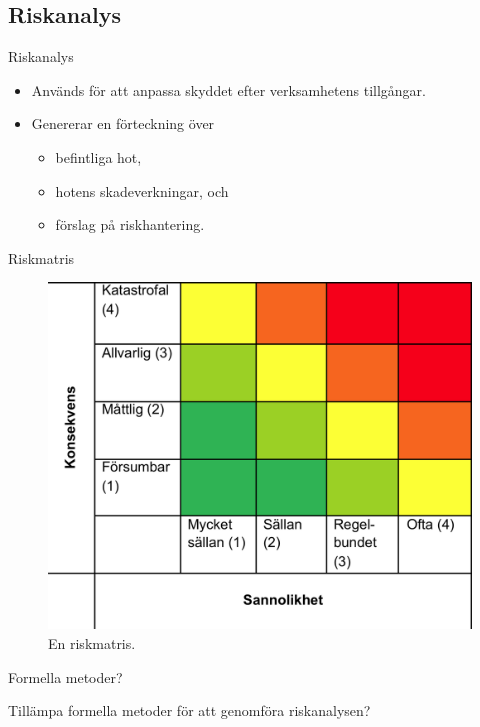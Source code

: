 \documentclass{beamer}
\begin{document}
\subsection{Riskanalys}
\begin{frame}{Riskanalys}
  \begin{itemize}
    \item Används för att anpassa skyddet efter verksamhetens tillgångar.
    \item Genererar en förteckning över
      \begin{itemize}
        \item befintliga hot,
        \item hotens skadeverkningar, och
        \item förslag på riskhantering.
      \end{itemize}
  \end{itemize}
\end{frame}
\begin{frame}{Riskmatris}
  \begin{figure}
    \includegraphics[height=0.7\textheight]{riskmatris.png}
    \caption{En riskmatris.}
  \end{figure}
\end{frame}
\begin{frame}{Formella metoder?}
  \begin{center}
    Tillämpa formella metoder för att genomföra riskanalysen?
  \end{center}
\end{frame}
\end{document}
